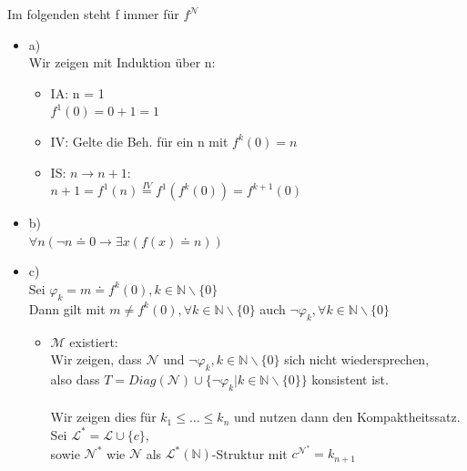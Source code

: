 \documentclass[a4paper]{scrartcl}%
\begin{document}
    Im folgenden steht f immer für $f^\mathcal{N}$
    \begin{itemize}
        \item a)\\
            Wir zeigen mit Induktion über n:\\
            \begin{itemize}
                \item IA: n = 1\\
                    $f^1(0) = 0 + 1 = 1$\\
                \item IV: Gelte die Beh. für ein n mit $f^k(0) = n$\\
                \item IS: $n \rightarrow n+1$:\\
                    $n + 1 = f^1(n) \overset{IV}{=} f^1(f^k(0)) = f^{k+1}(0)$\\
            \end{itemize}
        \item b)\\
            $\forall n (\neg n \doteq 0 \rightarrow \exists x(f(x) \doteq n))$\\
        \item c)\\
            Sei $\varphi_k = m \doteq f^k(0), k \in \mathds{N}\backslash\{0\}$\\
            Dann gilt mit $m \neq f^k(0), \forall k \in \mathds{N}\backslash\{0\}$ auch $\neg \varphi_k, \forall k \in \mathds{N}\backslash\{0\}$\\
            \begin{itemize}
                \item $\mathcal{M}$ existiert:\\
                    Wir zeigen, dass $\mathcal{N}$ und $\neg \varphi_k, k \in \mathds{N}\backslash\{0\}$ sich nicht wiedersprechen,\\
                    also dass $T = Diag(\mathcal{N}) \cup \{\neg \varphi_k | k \in \mathds{N}\backslash\{0\}\}$ konsistent ist.\\
                    \\Wir zeigen dies für $k_1 \leq \dots \leq k_n$ und nutzen dann den Kompaktheitssatz.\\
                    Sei $\mathscr{L}^* = \mathscr{L} \cup \{c\}$,\\
                    sowie $\mathcal{N}^*$ wie $\mathcal{N}$ als $ \mathscr{L}^*( \mathds{N})$-Struktur mit $c^{\mathcal{N}^*} = k_{n+1}$\\

\end{itemize}
\end{itemize}
\end{document}
